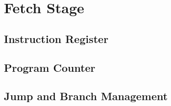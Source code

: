 \chapter{Fetch Stage}

\section{Instruction Register}
\section{Program Counter}
\section{Jump and Branch Management}